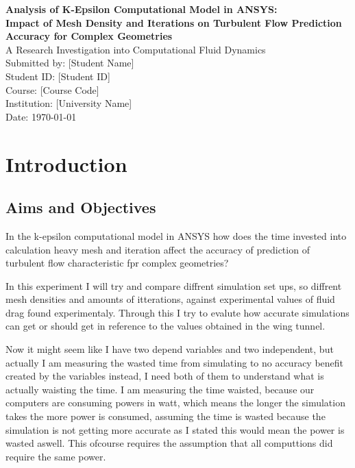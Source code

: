 \documentclass[12pt,a4paper]{article}
\begin{document}
\begin{titlepage}
\centering
\vspace*{2cm}
{\LARGE\bfseries Analysis of K-Epsilon Computational Model in ANSYS:\\[0.5cm] 
Impact of Mesh Density and Iterations on Turbulent Flow Prediction Accuracy for Complex Geometries}\\[2cm]

{\large A Research Investigation into Computational Fluid Dynamics}\\[1.5cm]

{\large Submitted by: [Student Name]}\\[0.5cm]
{\large Student ID: [Student ID]}\\[0.5cm]
{\large Course: [Course Code]}\\[0.5cm]
{\large Institution: [University Name]}\\[1.5cm]

{\large Date: \today}\\[2cm]

\vfill
\end{titlepage}

\newpage
\tableofcontents
\newpage

\listoffigures
\newpage

\listoftables
\newpage

\section{Introduction}

\subsection{Aims and Objectives}

In the k-epsilon computational model in ANSYS how does the time invested into calculation heavy mesh and iteration affect the accuracy of prediction of turbulent flow characteristic fpr complex geometries?

In this experiment I will try and compare diffrent simulation set ups, so diffrent mesh densities and amounts of itterations, against experimental values of fluid drag found experimentaly. Through this I try to evalute how accurate simulations can get or should get in reference to the values obtained in the wing tunnel.

Now it might seem like I have two depend variables and two independent, but actually I am measuring the wasted time from simulating to no accuracy benefit created by the variables instead, I need both of them to understand what is actually waisting the time. I am measuring the time waisted, because our computers are consuming powers in watt, which means the longer the simulation takes the more power is consumed, assuming the time is wasted because the simulation is not getting more accurate as I stated this would mean the power is wasted aswell. This ofcourse requires the assumption that all computtions did require the same power.
\end{document}
